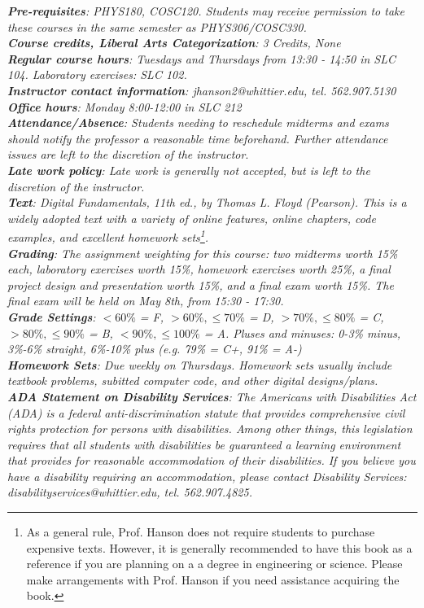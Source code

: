 \documentclass[10pt]{article}
\begin{document}
\noindent
\textit{\textbf{Pre-requisites}: PHYS180, COSC120.  Students may receive permission to take these courses in the same semester as PHYS306/COSC330.} \\
\textit{\textbf{Course credits, Liberal Arts Categorization}: 3 Credits, None} \\
\textit{\textbf{Regular course hours}: Tuesdays and Thursdays from 13:30 - 14:50 in SLC 104.  Laboratory exercises: SLC 102.} \\
\textit{\textbf{Instructor contact information}: jhanson2@whittier.edu, tel. 562.907.5130} \\
\textit{\textbf{Office hours}: Monday 8:00-12:00 in SLC 212} \\
\textit{\textbf{Attendance/Absence}: Students needing to reschedule midterms and exams should notify the professor a reasonable time beforehand. Further attendance issues are left to the discretion of the instructor}.\\ 
\textit{\textbf{Late work policy}: Late work is generally not accepted, but is left to the discretion of the instructor.} \\
\textit{\textbf{Text}:  Digital Fundamentals, 11th ed., by Thomas L. Floyd (Pearson).  This is a widely adopted text with a variety of online features, online chapters, code examples, and excellent homework sets\footnote{As a general rule, Prof. Hanson does not require students to purchase expensive texts.  However, it is generally recommended to have this book as a reference if you are planning on a a degree in engineering or science.  Please make arrangements with Prof. Hanson if you need assistance acquiring the book.}.} \\
\textit{\textbf{Grading}: The assignment weighting for this course: two midterms worth 15\% each, laboratory exercises worth 15\%, homework exercises worth 25\%, a final project design and presentation worth 15\%, and a final exam worth 15\%.  The final exam will be held on May 8th, from 15:30 - 17:30.} \\
\textit{\textbf{Grade Settings}: $<60\%$ = F, $>60\%,\leq 70\%$ = D, $>70\%,\leq80\%$ = C, $>80\%,\leq 90\%$ = B, $<90\%,\leq 100\%$ = A.  Pluses and minuses: 0-3\% minus, 3\%-6\% straight, 6\%-10\% plus (e.g. 79\% = C+, 91\% = A-)} \\
\textit{\textbf{Homework Sets}: Due weekly on Thursdays.  Homework sets usually include textbook problems, subitted computer code, and other digital designs/plans.} \\
\textit{\textbf{ADA Statement on Disability Services}: The Americans with Disabilities Act (ADA) is a federal anti-discrimination statute that provides comprehensive civil rights protection for persons with disabilities. Among other things, this legislation requires that all students with disabilities be guaranteed a learning environment that provides for reasonable accommodation of their disabilities. If you believe you have a disability requiring an accommodation, please contact Disability Services: disabilityservices@whittier.edu, tel. 562.907.4825.} \\
\end{document}

